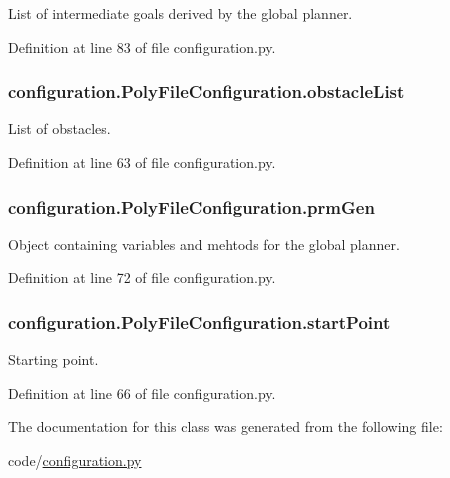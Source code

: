List of intermediate goals derived by the global planner. 



Definition at line 83 of file configuration.\-py.

\hypertarget{classconfiguration_1_1PolyFileConfiguration_a4ea5eea95680f3bfdad4adce0578a0f0}{
\subsubsection[{obstacle\-List}]{\setlength{\rightskip}{0pt plus 5cm}configuration.\-Poly\-File\-Configuration.\-obstacle\-List}}\label{classconfiguration_1_1PolyFileConfiguration_a4ea5eea95680f3bfdad4adce0578a0f0}


List of obstacles. 



Definition at line 63 of file configuration.\-py.

\hypertarget{classconfiguration_1_1PolyFileConfiguration_a075aa5177145a1041468f24e4829e8e8}{
\subsubsection[{prm\-Gen}]{\setlength{\rightskip}{0pt plus 5cm}configuration.\-Poly\-File\-Configuration.\-prm\-Gen}}\label{classconfiguration_1_1PolyFileConfiguration_a075aa5177145a1041468f24e4829e8e8}


Object containing variables and mehtods for the global planner. 



Definition at line 72 of file configuration.\-py.

\hypertarget{classconfiguration_1_1PolyFileConfiguration_ae5c780baacd4b800d1646a29a8608cbf}{
\subsubsection[{start\-Point}]{\setlength{\rightskip}{0pt plus 5cm}configuration.\-Poly\-File\-Configuration.\-start\-Point}}\label{classconfiguration_1_1PolyFileConfiguration_ae5c780baacd4b800d1646a29a8608cbf}


Starting point. 



Definition at line 66 of file configuration.\-py.



The documentation for this class was generated from the following file\-:\begin{DoxyCompactItemize}
\item 
code/\hyperlink{configuration_8py}{configuration.\-py}\end{DoxyCompactItemize}
